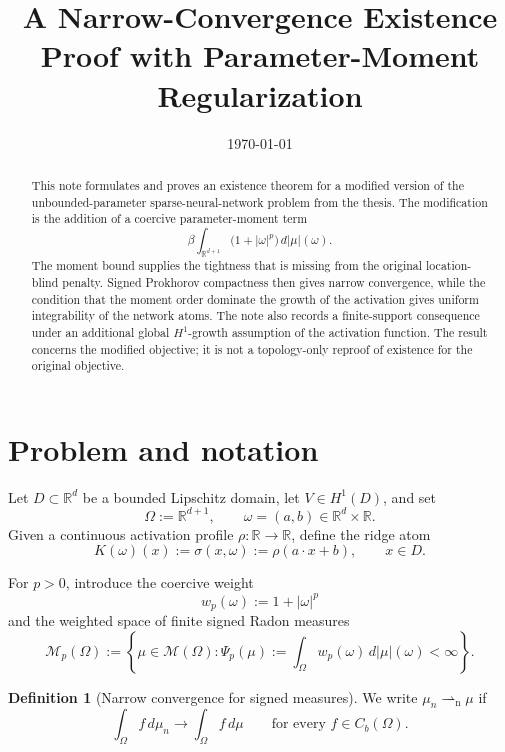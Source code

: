 \documentclass[11pt]{amsart}
\title{A Narrow-Convergence Existence Proof with Parameter-Moment Regularization}
\author{}
\date{\today}
\theoremstyle{definition}
\newtheorem{definition}[theorem]{Definition}
\theoremstyle{remark}
\newcommand{\R}{\mathbb{R}}
\newcommand{\M}{\mathcal{M}}
\newcommand{\weakn}{\rightharpoonup_{\mathrm n}}
\begin{document}
\begin{abstract}
This note formulates and proves an existence theorem for a modified version of
the unbounded-parameter sparse-neural-network problem from the thesis.  The
modification is the addition of a coercive parameter-moment term
\[
  \beta\int_{\R^{d+1}}\bigl(1+|\omega|^p\bigr)\,d|\mu|(\omega).
\]
The moment bound supplies the tightness that is missing from the original
location-blind penalty.  Signed Prokhorov compactness then gives narrow
convergence, while the condition that the moment order dominate the growth of
the activation gives uniform integrability of the network atoms.  The note also
records a finite-support consequence under an additional global
$H^1$-growth assumption of the activation function.  The result concerns the modified objective; it is
not a topology-only reproof of existence for the original objective.
\end{abstract}

\maketitle

\section{Problem and notation}

Let $D\subset\R^d$ be a bounded Lipschitz domain, let
$V\in H^1(D)$, and set
\[
  \Omega:=\R^{d+1},\qquad \omega=(a,b)\in\R^d\times\R.
\]
Given a continuous activation profile $\rho:\R\to\R$, define the ridge atom
\[
  K(\omega)(x):=\sigma(x,\omega):=\rho(a\cdot x+b),
  \qquad x\in D.
\]

For $p>0$, introduce the coercive weight
\[
  w_p(\omega):=1+|\omega|^p
\]
and the weighted space of finite signed Radon measures
\[
  \M_p(\Omega)
  :=
  \left\{
    \mu\in\M(\Omega):
    \Psi_p(\mu):=\int_\Omega w_p(\omega)\,d|\mu|(\omega)<\infty
  \right\}.
\]

\begin{definition}[Narrow convergence for signed measures]
We write $\mu_n\weakn\mu$ if
\[
  \int_\Omega f\,d\mu_n\longrightarrow\int_\Omega f\,d\mu
  \qquad\text{for every }f\in C_b(\Omega).
\]
\end{definition}
\end{document}
